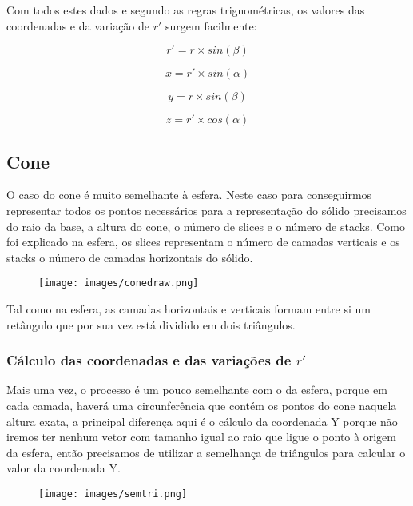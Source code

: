 \Huge\documentclass{article}
\begin{document}
Com todos estes dados e segundo as regras trignométricas, os valores das coordenadas e da variação de $r'$ surgem facilmente:

\[r' = r \times sin (\beta)\]

\[x = r' \times sin (\alpha)\]

\[y = r \times sin (\beta)\]

\[z = r' \times cos (\alpha)\]


\subsection{Cone}

O caso do cone é muito semelhante à esfera. Neste caso para conseguirmos representar todos os pontos necessários para a representação do sólido precisamos do raio da base, a altura do cone, o número de slices e o número de stacks. Como foi explicado na esfera, os slices representam o número de camadas verticais e os stacks o número de camadas horizontais do sólido.

\vspace{0.5cm}

\begin{figure}[h]
\centering
\texttt{[image: images/conedraw.png]}
\end{figure}

\vspace{0.5cm}

Tal como na esfera, as camadas horizontais e verticais formam entre si um retângulo que por sua vez está dividido em dois triângulos.

\subsubsection{Cálculo das coordenadas e das variações de $r'$}

Mais uma vez, o processo é um pouco semelhante com o da esfera, porque em cada camada, haverá uma circunferência que contém os pontos do cone naquela altura exata, a principal diferença aqui é o cálculo da coordenada Y porque não iremos ter nenhum vetor com tamanho igual ao raio que ligue o ponto à origem da esfera, então precisamos de utilizar a semelhança de triângulos para calcular o valor da coordenada Y.

\begin{figure}[h]
\centering
\texttt{[image: images/semtri.png]}
\end{figure}
\end{document}
